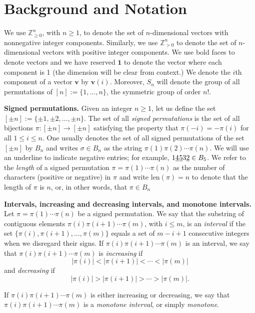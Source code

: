 \documentclass{article}
\numberwithin{equation}{section}
\theoremstyle{definition}
\newcommand{\V}{\textbf{v}}
\newcommand{\one}{\textbf{1}}
\newcommand{\len}{\text{len}}
\begin{document}
\section{Background and Notation}\label{sec:background}

We use $\mathbb{Z}^n_{\geq0}$, with $n\geq1$, to denote the set of $n$-dimensional vectors with nonnegative integer components. Similarly, we use $\mathbb{Z}^n_{>0}$ to denote the set of $n$-dimensional vectors with positive integer components. We use bold faces to denote vectors and we have reserved $\one$ to denote the vector where each component is 1 (the dimension will  be clear from context.) We denote the $i$th component of a vector $\V$ by $\V(i)$. Moreover, $S_n$ will denote the group of all permutations of $[n]:=\{1,\ldots,n\}$, the symmetric group of order $n!$.

\textbf{Signed permutations.} Given an integer $n\geq1$, let us define the set $[\pm n]:=\{\pm 1,\pm 2,\ldots,\pm n\}$. The set of all \emph{signed permutations} is the set of all bijections $\pi: [\pm n] \rightarrow [\pm n]$ satisfying the property that $\pi(-i)=-\pi(i)$ for all $1\leq i\leq n$. One usually denotes the set of all signed permutations of the set $[\pm n]$ by $B_n$ and writes $\sigma\in B_n$ as the string $\pi(1)\pi(2)\cdots \pi(n)$. We will use an underline to indicate negative entries; for example, $1 \underline{4}\hspace{0.02cm} \underline{5} 3 \underline{2}\in B_5$. We refer to the \emph{length} of a signed permutation $\pi=\pi(1)\cdots\pi(n)$ as the number of characters (positive or negative) in $\pi$ and write $\len(\pi)=n$ to denote that the length of $\pi$ is $n$, or, in other words, that $\pi\in B_n$

\textbf{Intervals, increasing and decreasing intervals, and monotone intervals.} Let $\pi=\pi(1)\cdots\pi(n)$ be a signed permutation. We say that the substring of contiguous elements $\pi(i)\pi(i+1)\cdots\pi(m)$, with $i\leq m$, is an \emph{interval} if the set $\{\pi(i),\pi(i+1),\ldots,\pi(m)\}$ equals a set of $m-i+1$ consecutive integers when we disregard their signs. If $\pi(i)\pi(i+1)\cdots\pi(m)$ is an interval, we say that $\pi(i)\pi(i+1)\cdots\pi(m)$ is \emph{increasing} if 
\[|\pi(i)|<|\pi(i+1)|<\cdots<|\pi(m)|\] and \emph{decreasing} if \[|\pi(i)|>|\pi(i+1)|>\cdots>|\pi(m)|.\]

If $\pi(i)\pi(i+1)\cdots\pi(m)$ is either increasing or decreasing, we say that $\pi(i)\pi(i+1)\cdots\pi(m)$ is a \textit{monotone interval}, or simply \emph{monotone}.
\end{document}
